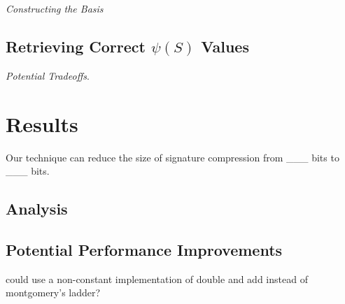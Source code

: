 \noindent
\textit{Constructing the Basis}

\subsection{Retrieving Correct $\psi(S)$ Values}

\noindent
\textit{Potential Tradeoffs}.

\section{Results}

Our technique can reduce the size of \sidh signature compression from \_\_\_ bits to \_\_\_ bits.

\subsection{Analysis}

\subsection{Potential Performance Improvements}

could use a non-constant implementation of double and add instead of montgomery's ladder? 

